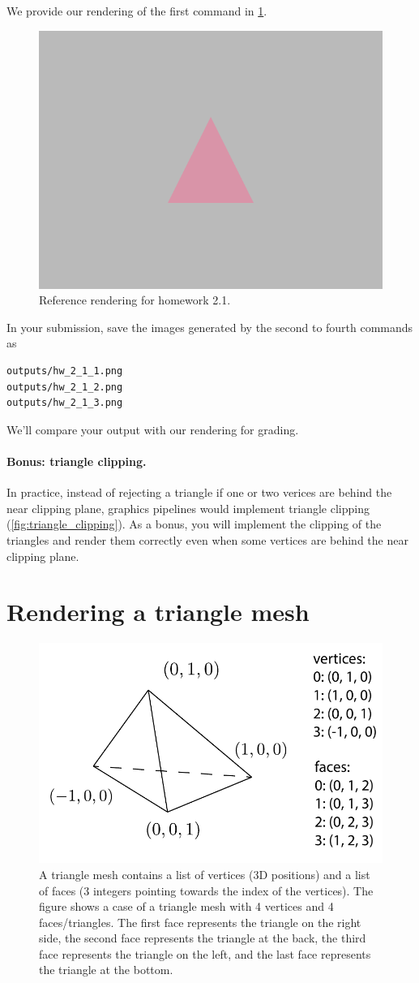 We provide our rendering of the first command in \cref{fig:hw2_1}.
\begin{figure}[h]
    \centering
    \includegraphics[width=0.5\linewidth]{imgs/hw_2_1.png}
    \caption{Reference rendering for homework 2.1.}
    \label{fig:hw2_1}
\end{figure}

In your submission, save the images generated by the second to fourth commands as
\begin{lstlisting}[language=bash]
outputs/hw_2_1_1.png
outputs/hw_2_1_2.png
outputs/hw_2_1_3.png
\end{lstlisting}
We'll compare your output with our rendering for grading.

\paragraph{Bonus: triangle clipping.} In practice, instead of rejecting a triangle if one or two verices are behind the near clipping plane, graphics pipelines would implement triangle clipping (\cref{fig:triangle_clipping}). As a bonus, you will implement the clipping of the triangles and render them correctly even when some vertices are behind the near clipping plane.

\section{Rendering a triangle mesh}

\begin{figure}[h]
    \centering
    \includegraphics[width=0.7\linewidth]{imgs/triangle_mesh.pdf}
    \caption{A triangle mesh contains a list of vertices (3D positions) and a list of faces (3 integers pointing towards the index of the vertices). The figure shows a case of a triangle mesh with 4 vertices and 4 faces/triangles. The first face represents the triangle on the right side, the second face represents the triangle at the back, the third face represents the triangle on the left, and the last face represents the triangle at the bottom.}
    \label{fig:triangle_mesh}
\end{figure}

